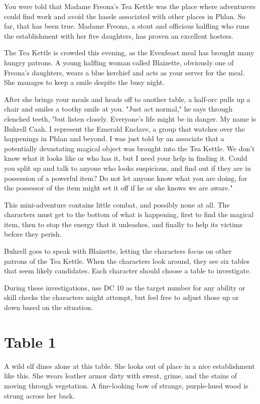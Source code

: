 \documentclass[10pt,a4paper,twoside,bg=print,twocolumn,openany,nodeprecatedcode]{dndbook}
\begin{document}
\begin{DndReadAloud}{}
You were told that Madame Freona's Tea Kettle was the place where adventurers could find work and avoid the hassle associated with other places in Phlan. So far, that has been true. Madame Freona, a stout and officious halfling who runs the establishment with her five daughters, has proven an excellent hostess.

The Tea Kettle is crowded this evening, as the Evenfeast meal has brought many hungry patrons. A young halfling woman called Blaizette, obviously one of Freona's daughters, wears a blue kerchief and acts as your server for the meal. She manages to keep a smile despite the busy night.

After she brings your meals and heads off to another table, a half-orc pulls up a chair and smiles a toothy smile at you. "Just act normal," he says through clenched teeth, "but listen closely. Everyone's life might be in danger. My name is Buhrell Caah. I represent the Emerald Enclave, a group that watches over the happenings in Phlan and beyond. I was just told by an associate that a potentially devastating magical object was brought into the Tea Kettle. We don't know what it looks like or who has it, but I need your help in finding it. Could you split up and talk to anyone who looks suspicious, and find out if they are in possession of a powerful item? Do not let anyone know what you are doing, for the possessor of the item might set it off if he or she knows we are aware."

\end{DndReadAloud}

This mini-adventure contains little combat, and possibly none at all. The characters must get to the bottom of what is happening, first to find the magical item, then to stop the energy that it unleashes, and finally to help its victims before they perish.

Buhrell goes to speak with Blaizette, letting the characters focus on other patrons of the Tea Kettle. When the characters look around, they see six tables that seem likely candidates. Each character should choose a table to investigate.

During these investigations, use DC 10 as the target number for any ability or skill checks the characters might attempt, but feel free to adjust those up or down based on the situation.

\section{Table 1}
\begin{DndReadAloud}{}
A wild elf dines alone at this table. She looks out of place in a nice establishment like this. She wears leather armor dirty with sweat, grime, and the stains of moving through vegetation. A fine-looking bow of strange, purple-hued wood is strung across her back.

\end{DndReadAloud}
\end{document}
